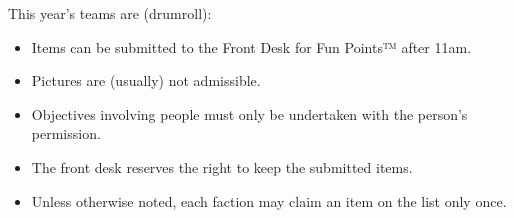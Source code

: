 
\vspace{1.8\baselineskip}

\begin{center} This year's teams are (drumroll): \end{center}

\vspace{\baselineskip}

\hfill
{}
\hfill

\vspace{1.8\baselineskip}

\begin{itemize}[leftmargin=*, itemsep=-0.7\baselineskip]
\item Items can be submitted to the Front Desk for Fun Points™ after 11am.
\item Pictures are (usually) not admissible.
\item Objectives involving people must only be undertaken with the
  person’s permission.
\item The front desk reserves the right to keep the submitted items.
\item Unless otherwise noted, each faction may claim an item on the
  list only once.
\end{itemize}

